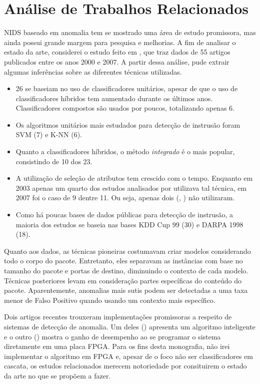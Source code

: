 \chapter{Análise de Trabalhos Relacionados}
\label{ch:analise}

NIDS baseado em anomalia tem se mostrado uma área de estudo promissora, mas ainda possui grande margem para pesquisa e melhorias.
A fim de analisar o estado da arte, considerei o estudo feito em \cite{tsai09}, que traz dados de 55 artigos publicados
entre os anos 2000 e 2007. A partir dessa análise, pude extrair algumas inferências sobre as diferentes técnicas utilizadas.
\begin{itemize}
    \item  26 se baseiam no uso de classificadores unitários, apesar de que o uso de
    classificadores híbridos tem aumentado durante os últimos anos.
    Classificadores compostos são usados por poucos, totalizando apenas 6.

    \item Os algoritmos unitários mais estudados para detecção de instrusão foram SVM (7) e K-NN (6).

    \item Quanto a classificadores híbridos, o método \textit{integrado} é o mais popular, consistindo de 10 dos 23.

    \item A utilização de seleção de atributos tem crescido com o tempo. Enquanto em 2003 apenas um quarto dos estudos analisados
por \cite{tsai09} utilizava tal técnica, em 2007 foi o caso de 9 dentre 11. Ou seja, apenas dois (\cite{peddabachigari07}, \cite{li07}) não utilizaram.

    \item Como há poucas bases de dados públicas para detecção de instrusão, a maioria dos estudos se baseia nas
    bases KDD Cup 99 (30) e DARPA 1998 (18).
\end{itemize}

\par Quanto aos dados, as técnicas pioneiras costumavam criar modelos considerando todo o corpo do pacote. Entretanto,
eles separavam as instâncias com base no tamanho do pacote e portas de destino, diminuindo o contexto de cada modelo.
Técnicas posteriores levam em consideração partes específicas do conteúdo do pacote. Aparentemente, anomalias mais
sutis podem ser detectadas a uma taxa menor de Falso Positivo quando usando um contexto mais específico.
\par Dois artigos recentes trouxeram implementações promissoras a respeito de sistemas de detecção de
anomalia. Um deles (\cite{lin12}) apresenta um algoritmo inteligente e o outro (\cite{papadonikolakis12}) mostra o
ganho de desempenho ao se programar o sistema diretamente em uma placa FPGA. Para os fins desta monografia, não irei
implementar o algoritmo em FPGA e, apesar de o foco não ser classificadores em cascata, os estudos relacionados merecem
notoriedade por consituirem o estado da arte no que se propõem a fazer.

